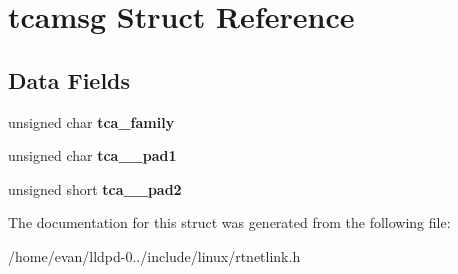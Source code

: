 \section{tcamsg \-Struct \-Reference}
\label{structtcamsg}
\subsection*{\-Data \-Fields}
\begin{DoxyCompactItemize}
\item 
unsigned char {\bfseries tca\-\_\-family}\label{structtcamsg_a35115fd3497f2462cfde3c4066a221ac}

\item 
unsigned char {\bfseries tca\-\_\-\-\_\-pad1}\label{structtcamsg_aaf38acf589c6a1698063fa594cd8bec5}

\item 
unsigned short {\bfseries tca\-\_\-\-\_\-pad2}\label{structtcamsg_aeeec001257a47ea44580d28c6e17872f}

\end{DoxyCompactItemize}


\-The documentation for this struct was generated from the following file\-:\begin{DoxyCompactItemize}
\item 
/home/evan/lldpd-\/0../include/linux/rtnetlink.\-h\end{DoxyCompactItemize}

